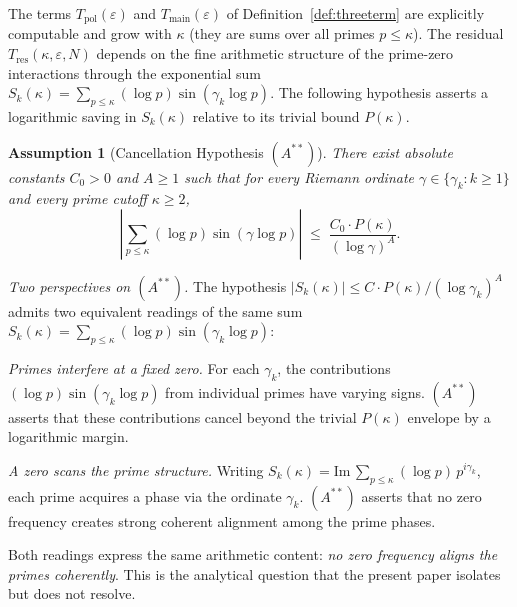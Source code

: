 \documentclass[11pt]{article}
\newtheorem{assumption}[theorem]{Assumption}
\newcommand{\Astar}{\ensuremath{(A^{**})}}  %
\begin{document}
The terms $T_{\mathrm{pol}}(\varepsilon)$ and $T_{\mathrm{main}}(\varepsilon)$
of Definition~\ref{def:threeterm}
are explicitly computable and grow with $\kappa$ (they are sums over
all primes $p\le\kappa$).
The residual $T_{\mathrm{res}}(\kappa,\varepsilon,N)$ depends on the fine arithmetic
structure of the prime-zero interactions through the exponential sum
$S_k(\kappa)=\sum_{p\le\kappa}(\log p)\sin(\gamma_k\log p)$.
The following hypothesis asserts a logarithmic saving in $S_k(\kappa)$
relative to its trivial bound $P(\kappa)$.

\begin{assumption}[Cancellation Hypothesis \Astar]
\label{ass:cancel}
There exist absolute constants $C_0>0$ and $A\ge 1$ such that
for every Riemann ordinate $\gamma\in\{\gamma_k:k\ge 1\}$ and every
prime cutoff $\kappa\ge 2$,
\[
\left|\sum_{p\le\kappa}(\log p)\sin(\gamma\log p)\right|
  \;\le\; \frac{C_0\cdot P(\kappa)}{(\log\gamma)^A}.
\]
\end{assumption}

\smallskip
\noindent\emph{Two perspectives on $(A^{**})$.}
The hypothesis $|S_k(\kappa)|\le C\cdot P(\kappa)/(\log\gamma_k)^A$
admits two equivalent readings of the same sum
$S_k(\kappa)=\sum_{p\le\kappa}(\log p)\sin(\gamma_k\log p)$:

\smallskip
\noindent\emph{Primes interfere at a fixed zero.}
For each $\gamma_k$, the contributions $(\log p)\sin(\gamma_k\log p)$
from individual primes have varying signs.
$(A^{**})$ asserts that these contributions cancel beyond the
trivial $P(\kappa)$ envelope by a logarithmic margin.

\smallskip
\noindent\emph{A zero scans the prime structure.}
Writing $S_k(\kappa)=\mathrm{Im}\,\sum_{p\le\kappa}(\log p)\,p^{i\gamma_k}$,
each prime acquires a phase via the ordinate $\gamma_k$.
$(A^{**})$ asserts that no zero frequency creates strong coherent
alignment among the prime phases.

\smallskip
Both readings express the same arithmetic content:
\emph{no zero frequency aligns the primes coherently}.
This is the analytical question that the present paper isolates
but does not resolve.
\end{document}
